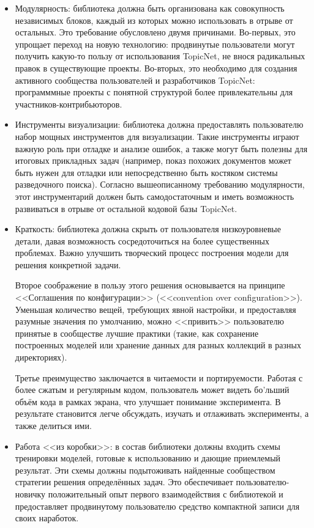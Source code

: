 \begin{itemize}
\item{Модулярность: библиотека должна быть организована как совокупность независимых блоков, каждый из которых можно использовать в отрыве от остальных. Это требование обусловлено двумя причинами. Во-первых, это упрощает переход на новую технологию: продвинутые пользователи могут получить какую-то пользу от использования TopicNet, не внося радикальных правок в существующие проекты. Во-вторых, это необходимо для создания активного сообщества пользователей и разработчиков TopicNet: программмные проекты с понятной структурой более привлекательны для участников-контрибьюторов.}

\item{Инструменты визуализации: библиотека должна предоставлять пользователю набор мощных инструментов для визуализации. 
Такие инструменты играют важную роль при отладке и анализе ошибок, а также могут быть полезны для итоговых прикладных задач (например, показ похожих документов может быть нужен для отладки или непосредственно быть костяком системы разведочного поиска). 
Согласно вышеописанному требованию модулярности, этот инструментарий должен быть самодостаточным и иметь возможность развиваться в отрыве от остальной кодовой базы TopicNet.}

\item{Краткость: библиотека должна скрыть от пользователя низкоуровневые детали, давая возможность сосредоточиться на более существенных проблемах. Важно улучшить творческий процесс построения модели для решения конкретной задачи. 

Второе соображение в пользу этого решения основывается на принципе <<Соглашения по конфигурации>> (<<convention over configuration>>). Уменьшая количество вещей, требующих явной настройки, и предоставляя разумные значения по умолчанию, можно <<привить>> пользователю принятые в сообществе лучшие практики (такие, как сохранение построенных моделей или хранение данных для разных коллекций в разных директориях).

Третье преимущество заключается в читаемости и портируемости. Работая с более сжатым и регулярным кодом, пользователь может видеть бо'льший объём кода в рамках экрана, что улучшает понимание эксперимента. В результате становится легче обсуждать, изучать и отлаживать эксперименты, а также делиться ими.}

\item{Работа <<из коробки>>: в состав библиотеки должны входить схемы тренировки моделей, готовые к использованию и дающие приемлемый результат. Эти схемы должны подытоживать найденные сообществом стратегии решения определённых задач. Это обеспечивает пользователю-новичку положительный опыт первого взаимодействия с библиотекой и предоставляет продвинутому пользователю средство компактной записи для своих наработок.}

\end{itemize}

